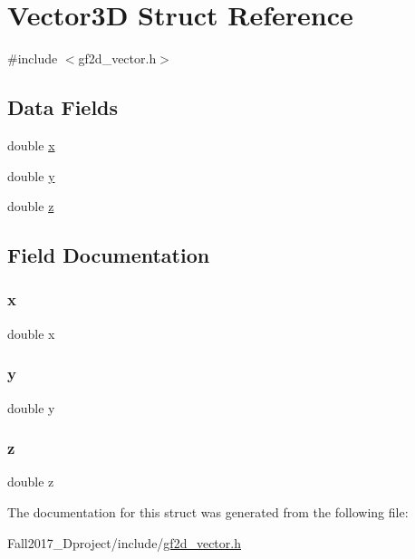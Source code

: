 \hypertarget{struct_vector3_d}{}\section{Vector3D Struct Reference}
\label{struct_vector3_d}


{\ttfamily \#include $<$gf2d\+\_\+vector.\+h$>$}

\subsection*{Data Fields}
\begin{DoxyCompactItemize}
\item 
double \hyperlink{struct_vector3_d_af88b946fb90d5f08b5fb740c70e98c10}{x}
\item 
double \hyperlink{struct_vector3_d_ab927965981178aa1fba979a37168db2a}{y}
\item 
double \hyperlink{struct_vector3_d_ab3e6ed577a7c669c19de1f9c1b46c872}{z}
\end{DoxyCompactItemize}


\subsection{Field Documentation}
\mbox{\label{struct_vector3_d_af88b946fb90d5f08b5fb740c70e98c10}} 
\subsubsection{\texorpdfstring{x}{x}}
{\footnotesize\ttfamily double x}

\mbox{\label{struct_vector3_d_ab927965981178aa1fba979a37168db2a}} 
\subsubsection{\texorpdfstring{y}{y}}
{\footnotesize\ttfamily double y}

\mbox{\label{struct_vector3_d_ab3e6ed577a7c669c19de1f9c1b46c872}} 
\subsubsection{\texorpdfstring{z}{z}}
{\footnotesize\ttfamily double z}



The documentation for this struct was generated from the following file\+:\begin{DoxyCompactItemize}
\item 
Fall2017\+\_\+Dproject/include/\hyperlink{gf2d__vector_8h}{gf2d\+\_\+vector.\+h}\end{DoxyCompactItemize}
